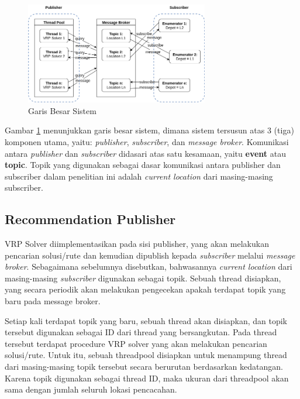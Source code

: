 \documentclass[conference]{IEEEtran}
\begin{document}
\begin{figure}[h]
	\centering
	\includegraphics[width=8cm]{Resources/Images/system-overview}
	\caption{Garis Besar Sistem}
	\label{fig:system-overview}
\end{figure}


Gambar \ref{fig:system-overview} menunjukkan garis besar sistem, dimana sistem tersusun atas 3 (tiga) komponen utama, yaitu: \textit{publisher}, \textit{subscriber}, dan \textit{message broker}. Komunikasi antara \textit{publisher} dan \textit{subscriber} didasari atas satu kesamaan, yaitu \textbf{event} atau \textbf{topic}. Topik yang digunakan sebagai dasar komunikasi antara publisher dan subscriber dalam penelitian ini adalah \textit{current location} dari masing-masing subscriber.


\subsection{Recommendation Publisher}
\label{ssec:recommendation-publisher}
VRP Solver diimplementasikan pada sisi publisher, yang akan melakukan pencarian solusi/rute dan kemudian dipublish kepada \textit{subscriber} melalui \textit{message broker}. Sebagaimana sebelumnya disebutkan, bahwasannya \textit{current location} dari masing-masing \textit{subscriber} digunakan sebagai topik. Sebuah thread disiapkan, yang secara periodik akan melakukan pengecekan apakah terdapat topik yang baru pada message broker.


Setiap kali terdapat topik yang baru, sebuah thread akan disiapkan, dan topik tersebut digunakan sebagai ID dari thread yang bersangkutan. Pada thread tersebut terdapat procedure VRP solver yang akan melakukan pencarian solusi/rute. Untuk itu, sebuah threadpool disiapkan untuk menampung thread dari masing-masing topik tersebut secara berurutan berdasarkan kedatangan. Karena topik digunakan sebagai thread ID, maka ukuran dari threadpool akan sama dengan jumlah seluruh lokasi pencacahan.
\end{document}
